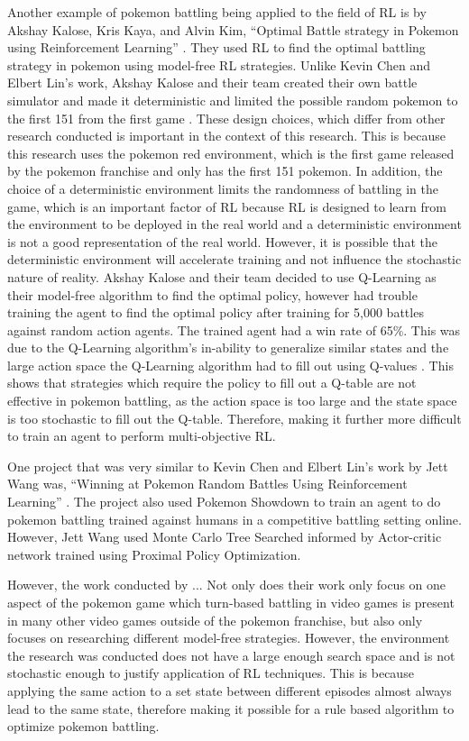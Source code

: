 Another example of pokemon battling being applied to the field of RL is by Akshay Kalose, Kris Kaya, and Alvin Kim, ``Optimal Battle strategy in Pokemon using Reinforcement Learning'' \cite{kalose2018optimal}. They used RL to find the optimal battling strategy in pokemon using model-free RL strategies. Unlike Kevin Chen and Elbert Lin's work, Akshay Kalose and their team created their own battle simulator and made it deterministic and limited the possible random pokemon to the first 151 from the first game \cite{kalose2018optimal}. These design choices, which differ from other research conducted is important in the context of this research. This is because this research uses the pokemon red environment, which is the first game released by the pokemon franchise and only has the first 151 pokemon. In addition, the choice of a deterministic environment limits the randomness of battling in the game, which is an important factor of RL because RL is designed to learn from the environment to be deployed in the real world and a deterministic environment is not a good representation of the real world. However, it is possible that the deterministic environment will accelerate training and not influence the stochastic nature of reality. Akshay Kalose and their team decided to use Q-Learning as their model-free algorithm to find the optimal policy, however had trouble training the agent to find the optimal policy after training for 5,000 battles against random action agents. The trained agent had a win rate of 65\%. This was due to the Q-Learning algorithm's in-ability to generalize similar states and the large action space the Q-Learning algorithm had to fill out using Q-values \cite{kalose2018optimal}. This shows that strategies which require the policy to fill out a Q-table are not effective in pokemon battling, as the action space is too large and the state space is too stochastic to fill out the Q-table. Therefore, making it further more difficult to train an agent to perform multi-objective RL.

One project that was very similar to Kevin Chen and Elbert Lin's work by Jett Wang was, ``Winning at Pokemon Random Battles Using Reinforcement Learning'' \cite{wang2024winning}. The project also used Pokemon Showdown to train an agent to do pokemon battling trained against humans in a competitive battling setting online. However, Jett Wang used Monte Carlo Tree Searched informed by Actor-critic network trained using Proximal Policy Optimization. 

However, the work conducted by ... Not only does their work only focus on one aspect of the pokemon game which turn-based battling in video games is present in many other video games outside of the pokemon franchise, but also only focuses on researching different model-free strategies. However, the environment the research was conducted does not have a large enough search space and is not stochastic enough to justify application of RL techniques. This is because applying the same action to a set state between different episodes almost always lead to the same state, therefore making it possible for a rule based algorithm to optimize pokemon battling. 



